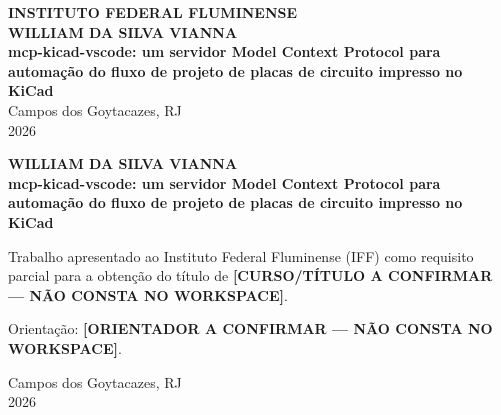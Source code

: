 
\begin{titlingpage}
\begin{center}
  \textbf{\MakeUppercase{Instituto Federal Fluminense}}\\[2\baselineskip]
  \textbf{\MakeUppercase{William da Silva Vianna}}\\[6\baselineskip]
  \textbf{mcp-kicad-vscode: um servidor Model Context Protocol para automação
  do fluxo de projeto de placas de circuito impresso no KiCad}\\[10\baselineskip]
  \vfill
  Campos dos Goytacazes, RJ\\[0.5\baselineskip]
  2026
\end{center}
\end{titlingpage}

\begin{titlingpage}
\begin{center}
  \textbf{\MakeUppercase{William da Silva Vianna}}\\[6\baselineskip]
  \textbf{mcp-kicad-vscode: um servidor Model Context Protocol para automação
  do fluxo de projeto de placas de circuito impresso no KiCad}\\[4\baselineskip]
\end{center}

\vspace{2\baselineskip}
\hfill
\begin{minipage}{0.55\textwidth}
  \SingleSpacing
  \footnotesize
  Trabalho apresentado ao Instituto Federal Fluminense (IFF) como requisito
  parcial para a obtenção do título de
  \textbf{[CURSO/TÍTULO A CONFIRMAR --- NÃO CONSTA NO WORKSPACE]}.

  Orientação: \textbf{[ORIENTADOR A CONFIRMAR --- NÃO CONSTA NO WORKSPACE]}.
\normalsize
\end{minipage}

\vfill
\begin{center}
  Campos dos Goytacazes, RJ\\
  2026
\end{center}
\end{titlingpage}

